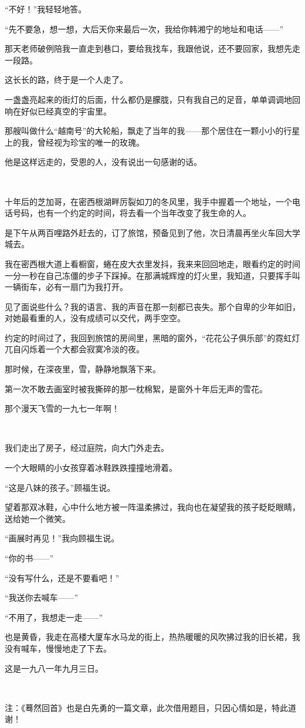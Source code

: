 \par “不好！”我轻轻地答。
\par “先不要急，想一想，大后天你来最后一次，我给你韩湘宁的地址和电话——”
\par 那天老师破例陪我一直走到巷口，要给我找车，我跟他说，还不要回家，我想先走一段路。
\par 这长长的路，终于是一个人走了。
\par 一盏盏亮起来的街灯的后面，什么都仍是朦胧，只有我自己的足音，单单调调地回响在好似已经真空的宇宙里。
\par 那艘叫做什么“越南号”的大轮船，飘走了当年的我——那个居住在一颗小小的行星上的我，曾经视为珍宝的唯一的玫瑰。
\par 他是这样远走的，受恩的人，没有说出一句感谢的话。
\par  
\par 十年后的芝加哥，在密西根湖畔厉裂如刀的冬风里，我手中握着一个地址，一个电话号码，也有一个约定的时间，将去看一个当年改变了我生命的人。
\par 是下午从两百哩路外赶去的，订了旅馆，预备见到了他，次日清晨再坐火车回大学城去。
\par 我在密西根大道上看橱窗，蜷在皮大衣里发抖，我来来回回地走，眼看约定的时间一分一秒在自己冻僵的步子下踩掉。在那满城辉煌的灯火里，我知道，只要挥手叫一辆街车，必有一扇门为我打开。
\par 见了面说些什么？我的语言、我的声音在那一刻都已丧失。那个自卑的少年如旧，对她最看重的人，没有成绩可以交代，两手空空。
\par 约定的时间过了，我回到旅馆的房间里，黑暗的窗外，“花花公子俱乐部”的霓虹灯兀自闪烁着一个大都会寂寞冷淡的夜。
\par 那时候，在深夜里，雪，静静地飘落下来。
\par 第一次不敢去画室时被我撕碎的那一枕棉絮，是窗外十年后无声的雪花。
\par 那个漫天飞雪的一九七一年啊！
\par  
\par 我们走出了房子，经过庭院，向大门外走去。
\par 一个大眼睛的小女孩穿着冰鞋跌跌撞撞地滑着。
\par “这是八妹的孩子。”顾福生说。
\par 望着那双冰鞋，心中什么地方被一阵温柔拂过，我向也在凝望我的孩子眨眨眼睛，送给她一个微笑。
\par “画展时再见！”我向顾福生说。
\par “你的书——”
\par “没有写什么，还是不要看吧！”
\par “我送你去喊车——”
\par “不用了，我想走一走——”
\par 也是黄昏，我走在高楼大厦车水马龙的街上，热热暖暖的风吹拂过我的旧长裙，我没有喊车，慢慢地走了下去。
\par 这是一九八一年九月三日。
\par  
\par 注：《蓦然回首》也是白先勇的一篇文章，此次借用题目，只因心情如是，特此道谢！




